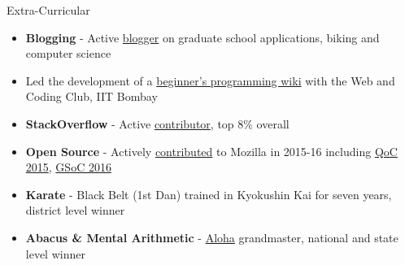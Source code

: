 \documentclass{resume} %
\begin{document}
\begin{rSection}{Extra-Curricular}
\begin{itemize}[leftmargin=*]
\item \textbf{Blogging} - Active \href{http://martiansideofthemoon.github.io/archive.html}{blogger} on graduate school applications, biking and computer science
\item Led the development of a \href{https://www.wncc-iitb.org/wiki/index.php/The_Web_and_Coding_Club}{beginner's programming wiki} with the Web and Coding Club, IIT Bombay
\item \textbf{StackOverflow} - Active \href{https://stackoverflow.com/users/5080995/martianwars}{contributor}, top 8\% overall
\item \textbf{Open Source} - Actively \href{http://martiansideofthemoon.github.io/open_source/}{contributed} to Mozilla in 2015-16 including \href{https://wiki.mozilla.org/Auto-tools/New_Contributor/Quarter_of_Contribution}{QoC 2015}, \href{https://summerofcode.withgoogle.com/archive/2016/projects/}{GSoC 2016}
\item \textbf{Karate} - Black Belt (1st Dan) trained in Kyokushin Kai for seven years, district level winner
\item \textbf{Abacus \& Mental Arithmetic} - \href{https://alohamindmath.com/}{Aloha} grandmaster, national and state level winner
\end{itemize}
\end{rSection}
\end{document}
